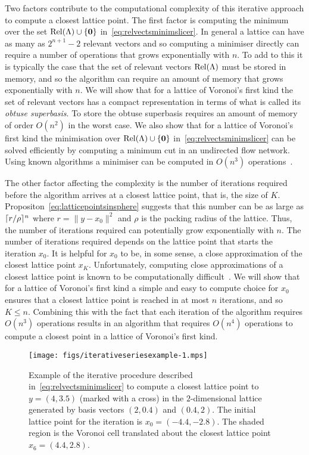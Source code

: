 \documentclass[final,leqno]{siamltex}
\begin{document}
Two factors contribute to the computational complexity of this iterative approach to compute a closest lattice point.  The first factor is computing the minimum over the set $\operatorname{Rel}(\Lambda) \cup \{\boldsymbol{0}\}$ in~\eqref{eq:relvectsminimslicer}.  In general a lattice can have as many as $2^{n+1}-2$ relevant vectors and so computing a minimiser directly can require a number of operations that grows exponentially with $n$.  To add to this it is typically the case that the set of relevant vectors $\operatorname{Rel}(\Lambda)$ must be stored in memory, and so the algorithm can require an amount of memory that grows exponentially with $n$.  We will show that for a lattice of Voronoi's first kind the set of relevant vectors has a compact representation in terms of what is called its \emph{obtuse superbasis}.  To store the obtuse superbasis requires an amount of memory of order $O(n^2)$ in the worst case.  We also show that for a lattice of Voronoi's first kind the minimisation over $\operatorname{Rel}(\Lambda) \cup \{\boldsymbol{0}\}$ in~\eqref{eq:relvectsminimslicer} can be solved efficiently by computing a minimum cut in an undirected flow network.  Using known algorithms a minimiser can be computed in $O(n^3)$ operations~\cite{Goldberg:1986:NAM:12130.12144,EdmondsKarp_max_flow,Cormen2001}. 

The other factor affecting the complexity is the number of iterations required before the algorithm arrives at a closest lattice point, that is, the size of $K$.  Propositon~\ref{eq:latticepointsinsphere} suggests that this number can be as large as $\lceil r/\rho \rceil^n$ where $r = \|y - x_0\|^2$ and $\rho$ is the packing radius of the lattice.  Thus, the number of iterations required can potentially grow exponentially with $n$.  The number of iterations required depends on the lattice point that starts the iteration $x_0$.  It is helpful for $x_0$ to be, in some sense, a close approximation of the closest lattice point $x_K$.  Unfortunately, computing close approximations of a closest lattice point is known to be computationally difficult~\cite{feige_inapproximability_2004}.  We will show that for a lattice of Voronoi's first kind a simple and easy to compute choice for $x_0$ ensures that a closest lattice point is reached in at most $n$ iterations, and so $K \leq n$.  Combining this with the fact that each iteration of the algorithm requires $O(n^3)$ operations results in an algorithm that requires $O(n^4)$ operations to compute a closest point in a lattice of Voronoi's first kind. 


\begin{figure}[tp] 
	\centering      
		\texttt{[image: figs/iterativeseriesexample-1.mps]} 
		\caption{Example of the iterative procedure described in~\eqref{eq:relvectsminimslicer} to compute a closest lattice point to $y = (4,3.5)$ (marked with a cross) in the $2$-dimensional lattice generated by basis vectors $(2,0.4)$ and $(0.4,2)$.  The initial lattice point for the iteration is $x_0 = (-4.4,-2.8)$.  The shaded region is the Voronoi cell translated about the closest lattice point $x_6 = (4.4,2.8)$.}       
		\label{lattices:fig:iterativeexample} 
\end{figure} 
\end{document}
